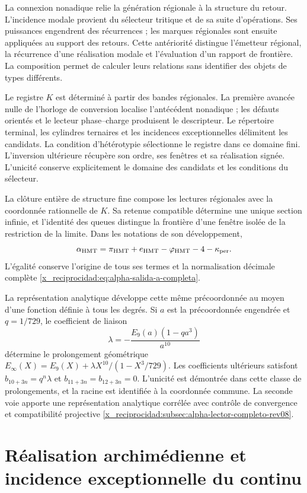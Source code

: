 La connexion nonadique relie la génération régionale à la structure du retour. L’incidence modale provient du sélecteur tritique et de sa suite d’opérations. Ses puissances engendrent des récurrences ; les marques régionales sont ensuite appliquées au support des retours. Cette antériorité distingue l’émetteur régional, la récurrence d’une réalisation modale et l’évaluation d’un rapport de frontière. La composition permet de calculer leurs relations sans identifier des objets de types différents.

Le registre \(K\) est déterminé à partir des bandes régionales. La première avancée nulle de l’horloge de conversion localise l’antécédent nonadique ; les défauts orientés et le lecteur phase--charge produisent le descripteur. Le répertoire terminal, les cylindres ternaires et les incidences exceptionnelles délimitent les candidats. La condition d’hétérotypie sélectionne le registre dans ce domaine fini. L’inversion ultérieure récupère son ordre, ses fenêtres et sa réalisation signée. L’unicité conserve explicitement le domaine des candidats et les conditions du sélecteur.

La clôture entière de structure fine compose les lectures régionales avec la coordonnée rationnelle de \(K\). Sa retenue compatible détermine une unique section infinie, et l’identité des queues distingue la frontière d’une fenêtre isolée de la restriction de la limite. Dans les notations de son développement,
\[
 \alpha_{\rm HMT}
 =\pi_{\rm HMT}+e_{\rm HMT}-\varphi_{\rm HMT}
  -4-\kappa_{\rm per}.
\]
L’égalité conserve l’origine de tous ses termes et la normalisation décimale complète \eqref{x_reciprocidad:eq:alpha-salida-a-completa}.

La représentation analytique développe cette même précoordonnée au moyen d’une fonction définie à tous les degrés. Si \(a\) est la précoordonnée engendrée et \(q=1/729\), le coefficient de liaison
\[
 \lambda=-\frac{E_9(a)(1-qa^3)}{a^{10}}
\]
détermine le prolongement géométrique \(E_\infty(X)=E_9(X)+\lambda X^{10}/(1-X^3/729)\). Les coefficients ultérieurs satisfont \(b_{10+3n}=q^n\lambda\) et \(b_{11+3n}=b_{12+3n}=0\). L’unicité est démontrée dans cette classe de prolongements, et la racine est identifiée à la coordonnée commune. La seconde voie apporte une représentation analytique corrélée avec contrôle de convergence et compatibilité projective \ref{x_reciprocidad:subsec:alpha-lector-completo-rev08}.

\section{Réalisation archimédienne et incidence exceptionnelle du continu}

